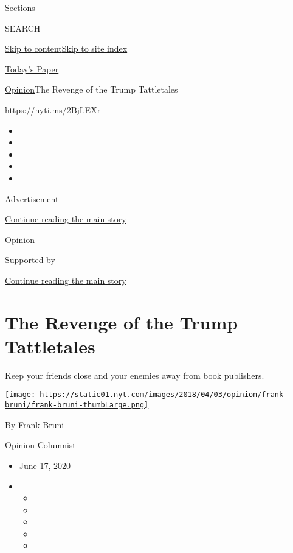Sections

SEARCH

\protect\hyperlink{site-content}{Skip to
content}\protect\hyperlink{site-index}{Skip to site index}

\href{https://myaccount.nytimes.com/auth/login?response_type=cookie\&client_id=vi}{}

\href{https://www.nytimes.com/section/todayspaper}{Today's Paper}

\href{/section/opinion}{Opinion}\textbar{}The Revenge of the Trump
Tattletales

\href{https://nyti.ms/2BjLEXr}{https://nyti.ms/2BjLEXr}

\begin{itemize}
\item
\item
\item
\item
\item
\end{itemize}

Advertisement

\protect\hyperlink{after-top}{Continue reading the main story}

\href{/section/opinion}{Opinion}

Supported by

\protect\hyperlink{after-sponsor}{Continue reading the main story}

\hypertarget{the-revenge-of-the-trump-tattletales}{%
\section{The Revenge of the Trump
Tattletales}\label{the-revenge-of-the-trump-tattletales}}

Keep your friends close and your enemies away from book publishers.

\href{https://www.nytimes.com/by/frank-bruni}{\texttt{[image: https://static01.nyt.com/images/2018/04/03/opinion/frank-bruni/frank-bruni-thumbLarge.png]}}

By \href{https://www.nytimes.com/by/frank-bruni}{Frank Bruni}

Opinion Columnist

\begin{itemize}
\item
  June 17, 2020
\item
  \begin{itemize}
  \item
  \item
  \item
  \item
  \item
  \end{itemize}
\end{itemize}

